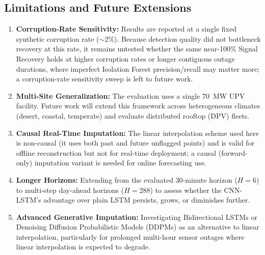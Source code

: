 \documentclass[conference]{IEEEtran}
\begin{document}
\subsection*{Limitations and Future Extensions}
\begin{enumerate}
    \item \textbf{Corruption-Rate Sensitivity:} Results are reported at a single fixed synthetic corruption rate ($\sim$2\%). Because detection quality did not bottleneck recovery at this rate, it remains untested whether the same near-100\% Signal Recovery holds at higher corruption rates or longer contiguous outage durations, where imperfect Isolation Forest precision/recall may matter more; a corruption-rate sensitivity sweep is left to future work.
    \item \textbf{Multi-Site Generalization:} The evaluation uses a single 70~MW UPV facility. Future work will extend this framework across heterogeneous climates (desert, coastal, temperate) and evaluate distributed rooftop (DPV) fleets.
    \item \textbf{Causal Real-Time Imputation:} The linear interpolation scheme used here is non-causal (it uses both past and future unflagged points) and is valid for offline reconstruction but not for real-time deployment; a causal (forward-only) imputation variant is needed for online forecasting use.
    \item \textbf{Longer Horizons:} Extending from the evaluated 30-minute horizon ($H=6$) to multi-step day-ahead horizons ($H=288$) to assess whether the CNN-LSTM's advantage over plain LSTM persists, grows, or diminishes further.
    \item \textbf{Advanced Generative Imputation:} Investigating Bidirectional LSTMs or Denoising Diffusion Probabilistic Models (DDPMs) as an alternative to linear interpolation, particularly for prolonged multi-hour sensor outages where linear interpolation is expected to degrade.
\end{enumerate}
\end{document}
